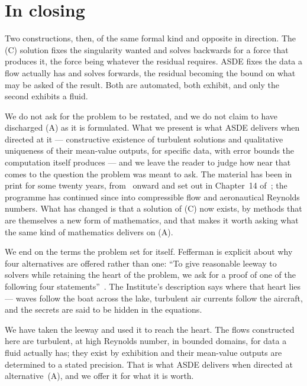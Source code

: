 \documentclass[11pt]{article}
\begin{document}
\section{In closing}

Two constructions, then, of the same formal kind and opposite in direction. The (C) solution fixes
the singularity wanted and solves backwards for a force that produces it, the force being whatever
the residual requires. ASDE fixes the data a flow actually has and solves forwards, the residual
becoming the bound on what may be asked of the result. Both are automated, both exhibit, and only
the second exhibits a fluid.

We do not ask for the problem to be restated, and we do not claim to have discharged (A) as it is
formulated. What we present is what ASDE delivers when directed at it --- constructive existence of
turbulent solutions and qualitative uniqueness of their mean-value outputs, for specific data, with
error bounds the computation itself produces --- and we leave the reader to judge how near that comes
to the question the problem was meant to ask. The material has been in print
for some twenty years, from~\cite{newapproach} onward and set out in Chapter~14 of~\cite{cfd}; the
programme has continued since into compressible flow and aeronautical Reynolds numbers. What has changed is that a solution of (C) now exists, by methods
that are themselves a new form of mathematics, and that makes it worth asking what the same kind of
mathematics delivers on (A).

We end on the terms the problem set for itself. Fefferman is explicit about why four alternatives are
offered rather than one: ``To give reasonable leeway to solvers while retaining the heart of the
problem, we ask for a proof of one of the following four statements''~\cite{fefferman}. The
Institute's description says where that heart lies --- waves follow the boat across the lake,
turbulent air currents follow the aircraft, and the secrets are said to be hidden in the equations.

We have taken the leeway and used it to reach the heart. The flows constructed here are turbulent, at
high Reynolds number, in bounded domains, for data a fluid actually has; they exist by exhibition and
their mean-value outputs are determined to a stated precision. That is what ASDE delivers when
directed at alternative~(A), and we offer it for what it is worth.
\end{document}
